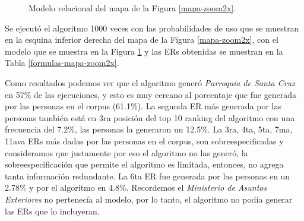 \begin{figure}[H]
\caption{Modelo relacional del mapa de la Figura \ref{mapa-zoom2x}.}
\label{modelo-mapa-zoom2x}
\end{figure}


Se ejecut\'o el algoritmo 1000 veces con las probabilidades de uso que se muestran en la esquina inferior derecha del mapa de la Figura \ref{mapa-zoom2x}, con el modelo que se muestra en la Figura \ref{modelo-mapa-zoom2x} y las ERs obtenidas se muestran en la Tabla \ref{formulas-mapa-zoom2x}.


Como resultados podemos ver que el algoritmo gener\'o {\it Parroquia de Santa Cruz} en 57\% de las ejecuciones, y esto es muy cercano al porcentaje que fue generada por las personas en el corpus (61.1\%). La segunda ER m\'as generada por las personas tambi\'en est\'a en 3ra posici\'on del top 10 ranking del algoritmo con una frecuencia del 7.2\%, las personas la generaron un 12.5\%. La 3ra, 4ta, 5ta, 7ma, 11ava ERs m\'as dadas por las personas en el corpus, son sobreespecificadas y consideramos que justamente por eso el algoritmo no las gener\'o, la sobreespecificaci\'on que permite el algoritmo es limitada, entonces, no agrega tanta informaci\'on redundante. La 6ta ER fue generada por las personas en un 2.78\% y por el algoritmo en 4.8\%. Recordemos el {\it Ministerio de Asuntos Exteriores} no pertenec\'ia al modelo, por lo tanto, el algoritmo no pod\'ia generar las ERs que lo incluyeran.%



